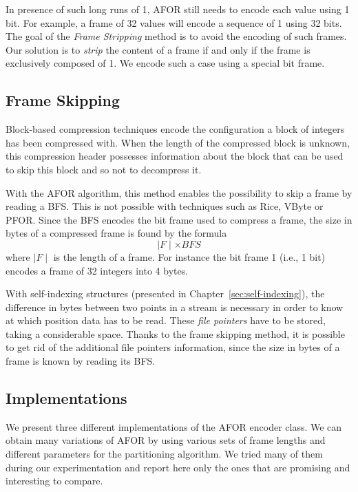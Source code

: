 In presence of such long runs of 1, AFOR still needs to encode each value
using 1 bit. For example, a frame of 32 values will encode a sequence of 1
using 32 bits. The goal of the \emph{Frame Stripping} method is to avoid the
encoding of such frames. Our solution is to \emph{strip} the content of a
frame if and only if the frame is exclusively composed of 1. We encode such a
case using a special bit frame.

\subsection{Frame Skipping}
\label{sec:afor-skip}

Block-based compression techniques encode the configuration a block of integers
has been compressed with. When the length of the compressed block is unknown,
this compression header possesses information about the block that can be used
to skip this block and so not to decompress it.

With the AFOR algorithm, this method enables the possibility to skip a frame by
reading a BFS. This is not possible with techniques such as Rice, VByte or
PFOR. Since the BFS encodes the bit frame used to compress a frame, the size
in bytes of a compressed frame is found by the formula
\begin{displaymath}
\mid F \mid \times BFS
\end{displaymath}
where $\mid F \mid$ is the length of a frame. For instance the bit frame 1
(i.e., 1 bit) encodes a frame of 32 integers into 4 bytes.

With self-indexing structures (presented in Chapter~\ref{sec:self-indexing}),
the difference in bytes between two points in a stream is necessary in order to
know at which position data has to be read. These \emph{file pointers} have to
be stored, taking a considerable space. Thanks to the frame skipping method, it
is possible to get rid of the additional file pointers information, since the
size in bytes of a frame is known by reading its BFS.

\subsection{Implementations}

We present three different implementations of the AFOR encoder class. We can
obtain many variations of AFOR by using various sets of frame lengths and
different parameters for the partitioning algorithm. We tried many of them
during our experimentation and report here only the ones that are promising
and interesting to compare.

